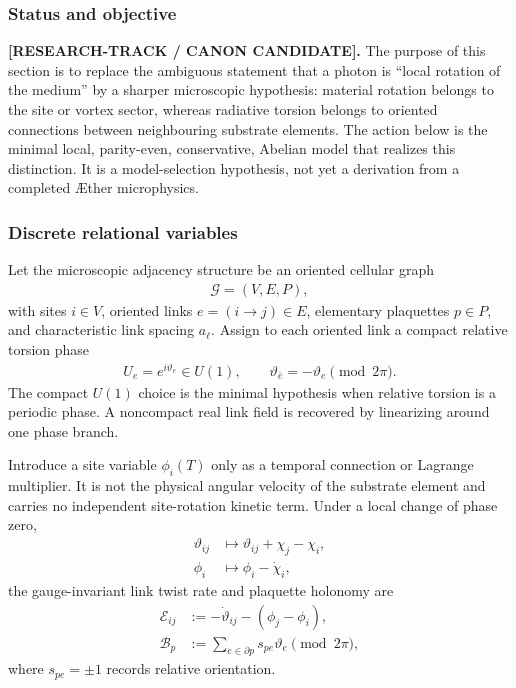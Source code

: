\subsubsection{Status and objective}

\textbf{[RESEARCH-TRACK / CANON CANDIDATE].}
The purpose of this section is to replace the ambiguous statement that a photon
is ``local rotation of the medium'' by a sharper microscopic hypothesis:
material rotation belongs to the site or vortex sector, whereas radiative
torsion belongs to oriented connections between neighbouring substrate elements.
The action below is the minimal local, parity-even, conservative, Abelian model
that realizes this distinction.  It is a model-selection hypothesis, not yet a
derivation from a completed \AE ther microphysics.

\subsubsection{Discrete relational variables}

Let the microscopic adjacency structure be an oriented cellular graph
\begin{align}
    \mathcal G=(V,E,P),
\end{align}
with sites $i\in V$, oriented links $e=(i\!\to\!j)\in E$, elementary
plaquettes $p\in P$, and characteristic link spacing $a_\ell$.  Assign to each
oriented link a compact relative torsion phase
\begin{align}
    U_e=e^{i\vartheta_e}\in U(1),
    \qquad
    \vartheta_{\bar e}=-\vartheta_e\pmod{2\pi}.
    \label{eq:rt_link_compact_phase}
\end{align}
The compact $U(1)$ choice is the minimal hypothesis when relative torsion is a
periodic phase.  A noncompact real link field is recovered by linearizing around
one phase branch.

Introduce a site variable $\phi_i(T)$ only as a temporal connection or Lagrange
multiplier.  It is not the physical angular velocity of the substrate element and
carries no independent site-rotation kinetic term.  Under a local change of
phase zero,
\begin{align}
    \vartheta_{ij}
    &\mapsto
    \vartheta_{ij}+\chi_j-\chi_i,
    \\
    \phi_i
    &\mapsto
    \phi_i-\dot\chi_i,
    \label{eq:rt_link_gauge_transformation}
\end{align}
the gauge-invariant link twist rate and plaquette holonomy are
\begin{align}
    \mathscr E_{ij}
    &:=-\dot\vartheta_{ij}-(\phi_j-\phi_i),
    \label{eq:rt_link_electric_variable}
    \\
    \mathscr B_p
    &:={\sum}_{e\in\partial p}s_{pe}\vartheta_e
    \pmod{2\pi},
    \label{eq:rt_link_plaquette_holonomy}
\end{align}
where $s_{pe}=\pm1$ records relative orientation.

